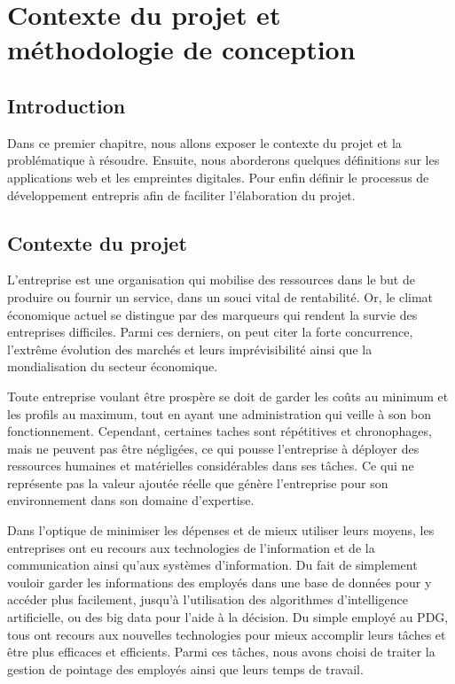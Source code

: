 \chapter{Contexte du projet et méthodologie de
conception}
\renewcommand{\headrulewidth}{1pt}


\section{Introduction}
Dans ce premier chapitre, nous allons exposer le contexte du projet et la
problématique à résoudre. Ensuite, nous aborderons quelques définitions sur les
applications web et les empreintes digitales. Pour enfin définir le processus de
développement entrepris afin de faciliter l’élaboration du projet.


\section{Contexte du projet}
L’entreprise est une organisation qui mobilise des ressources dans le but de
produire ou fournir un service, dans un souci vital de rentabilité. Or, le
climat économique actuel se distingue par des marqueurs qui rendent la survie
des entreprises difficiles. Parmi ces derniers, on peut citer la forte
concurrence, l’extrême évolution des marchés et leurs imprévisibilité ainsi que
la mondialisation du secteur économique. 

Toute entreprise voulant être prospère se doit de garder les coûts au minimum et
les profils au maximum, tout en ayant une administration qui veille à son bon
fonctionnement. Cependant, certaines taches sont répétitives et chronophages,
mais ne peuvent pas être négligées, ce qui pousse l’entreprise à déployer des
ressources humaines et matérielles considérables dans ses tâches. Ce qui ne
représente pas la valeur ajoutée réelle que génère l’entreprise pour son
environnement dans son domaine d’expertise. 

Dans l’optique de minimiser les dépenses et de mieux utiliser leurs moyens, les
entreprises ont eu recours aux technologies de l’information et de la
communication ainsi qu’aux systèmes d’information. Du fait de simplement vouloir
garder les informations des employés dans une base de données pour y accéder
plus facilement, jusqu’à l’utilisation des algorithmes d’intelligence
artificielle, ou des big data pour l’aide à la décision. Du simple employé au
PDG, tous ont recours aux nouvelles technologies pour mieux accomplir leurs
tâches et être plus efficaces et efficients. Parmi ces tâches, nous avons choisi
de traiter la gestion de pointage des employés ainsi que leurs temps de travail.  

